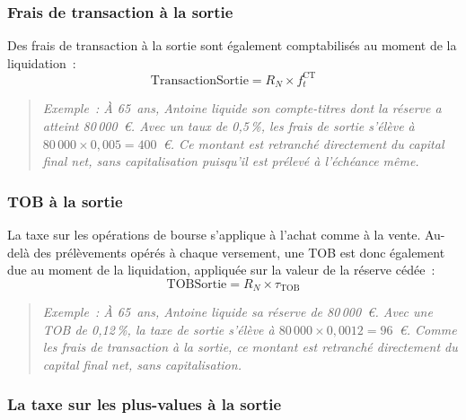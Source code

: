﻿\documentclass[12pt, a4paper]{article}
\begin{document}
\subsubsection*{Frais de transaction à la sortie}

Des frais de transaction à la sortie sont également comptabilisés au moment de la
liquidation~:
\begin{equation}
  \text{TransactionSortie} = R_N \times f_t^{\text{CT}}
\end{equation}

\begin{quote}
\textit{Exemple~: À 65~ans, Antoine liquide son compte-titres dont la réserve a
atteint 80\,000~€. Avec un taux de 0{,}5\,\%, les frais de sortie
s'élève à $80\,000 \times 0{,}005 = 400$~€. Ce montant est retranché directement
du capital final net, sans capitalisation puisqu'il est prélevé à l'échéance
même.}
\end{quote}

\subsubsection*{TOB à la sortie}

La taxe sur les opérations de bourse
s'applique à l'achat comme à la vente. Au-delà des prélèvements opérés à
chaque versement, une TOB est donc également due au moment de la liquidation,
appliquée sur la valeur de la réserve cédée~:
\begin{equation}
  \text{TOBSortie} = R_N \times \tau_{\text{TOB}}
\end{equation}

\begin{quote}
\textit{Exemple~: À 65~ans, Antoine liquide sa réserve de 80\,000~€. Avec une
TOB de 0{,}12\,\%, la taxe de sortie s'élève à $80\,000 \times 0{,}0012 = 96$~€.
Comme les frais de transaction à la sortie, ce montant est retranché directement du capital
final net, sans capitalisation.}
\end{quote}

\subsubsection*{La taxe sur les plus-values à la sortie}
\label{sub:taxe_pv_ct}
\end{document}

